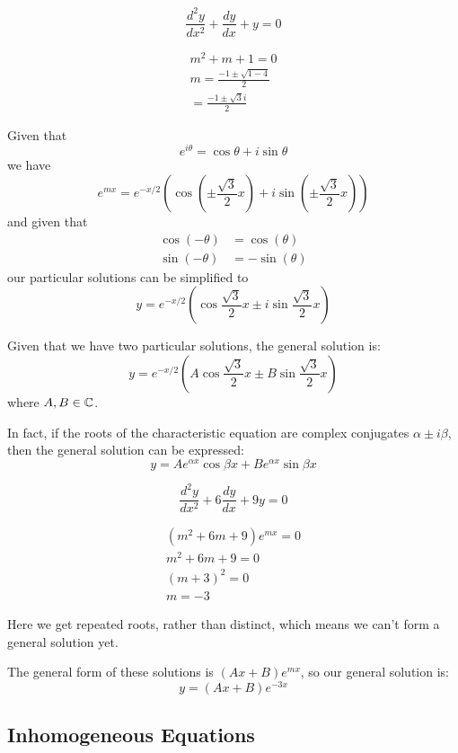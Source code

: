 \documentclass[a4paper,10pt]{article}
\begin{document}
\begin{ex}
	\[
		\frac{d^2y}{dx^2} + \frac{dy}{dx} + y = 0
	\]

	\begin{gather*}
		m^2 + m + 1 = 0 \\
		m = \frac{-1 \pm \sqrt{1-4}}{2} \\
		= \frac{-1 \pm \sqrt{3}i}{2}
	\end{gather*}

	Given that
	\[
		e^{i\theta} = \cos{\theta} + i\sin{\theta}
	\]
	we have
	\[
		e^{mx} = e^{-x/2}\left(\cos(\pm \frac{\sqrt{3}}{2}x)
		+ i\sin(\pm\frac{\sqrt{3}}{2}x)\right)
	\]
	and given that
	\begin{align*}
		\cos(-\theta) &= \cos(\theta) \\
		\sin(-\theta) &= -\sin(\theta)
	\end{align*}
	our particular solutions can be simplified to
	\[
		y = e^{-x/2}\left(\cos \frac{\sqrt{3}}{2}x
		\pm i\sin\frac{\sqrt{3}}{2}x\right)
	\]

	Given that we have two particular solutions, the general solution is:
	\[
		y = e^{-x/2}\left(A\cos \frac{\sqrt{3}}{2}x
		\pm B\sin\frac{\sqrt{3}}{2}x\right)
	\]
	where $A,B \in \mathbb{C}$.

	In fact, if the roots of the characteristic equation are complex
	conjugates $\alpha \pm i\beta$, then the general solution can be
	expressed:
	\[
		y = Ae^{\alpha x}\cos\beta x + Be^{\alpha x}\sin\beta x
	\]

\end{ex}

\begin{ex}
	\[
		\frac{d^2y}{dx^2} + 6 \frac{dy}{dx} + 9y = 0
	\]

	\begin{gather*}
		(m^2 + 6m + 9)e^{mx} = 0 \\
		m^2 + 6m + 9 = 0 \\
		(m+3)^2  = 0 \\
		m = -3
	\end{gather*}

	Here we get repeated roots, rather than distinct, which means we
	can't form a general solution yet.

	The general form of these solutions is $(Ax+B)e^{mx}$, so our
	general solution is:
	\[
		y = (Ax+B)e^{-3x}
	\]
\end{ex}

\subsection{Inhomogeneous Equations}
\end{document}
